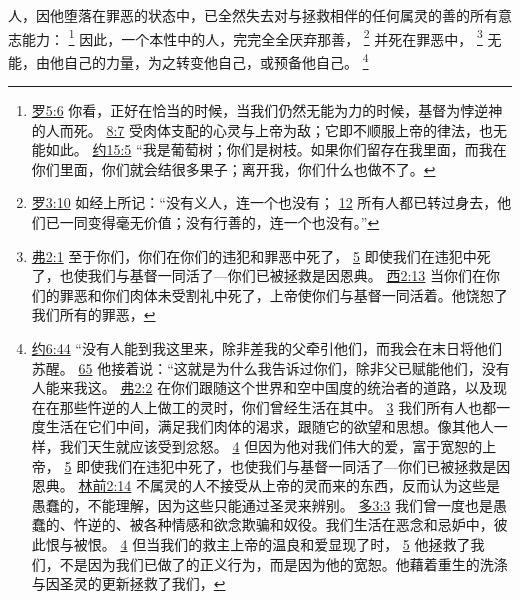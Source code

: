 \documentclass[12pt, a4paper, oneside]{ctexart}
\newcounter{parnum}[section]
\newcommand{\N}{%
   \noindent\refstepcounter{parnum}%
    \makebox[\parindent][l]{\textbf{\arabic{parnum}.}}}
\begin{document}
\N 人，因他堕落在罪恶的状态中，已全然失去对与拯救相伴的任何属灵的善的所有意志能力：
	\footnote {
		\href{https://biblehub.com/romans/5-6.htm}{罗5:6} 你看，正好在恰当的时候，当我们仍然无能为力的时候，基督为悖逆神的人而死。
		\href{https://biblehub.com/romans/8-7.htm}{8:7} 受肉体支配的心灵与上帝为敌；它即不顺服上帝的律法，也无能如此。
		\href{https://biblehub.com/john/15-5.htm}{约15:5} “我是葡萄树；你们是树枝。如果你们留存在我里面，而我在你们里面，你们就会结很多果子；离开我，你们什么也做不了。
	}
	因此，一个本性中的人，完完全全厌弃那善，
	\footnote {
		\href{https://biblehub.com/romans/3-10.htm}{罗3:10} 如经上所记：“没有义人，连一个也没有；
		\href{https://biblehub.com/romans/3-12.htm}{12} 所有人都已转过身去，他们已一同变得毫无价值；没有行善的，连一个也没有。”
	}
	并死在罪恶中，
	\footnote {
		\href{https://biblehub.com/ephesians/2-1.htm}{弗2:1} 至于你们，你们在你们的违犯和罪恶中死了， 
		\href{https://biblehub.com/ephesians/2-5.htm}{5} 即使我们在违犯中死了，也使我们与基督一同活了---你们已被拯救是因恩典。
		\href{https://biblehub.com/colossians/2-13.htm}{西2:13} 当你们在你们的罪恶和你们肉体未受割礼中死了，上帝使你们与基督一同活着。他饶恕了我们所有的罪恶，
	}
	无能，由他自己的力量，为之转变他自己，或预备他自己。
	\footnote {
		\href{https://biblehub.com/john/6-44.htm}{约6:44} “没有人能到我这里来，除非差我的父牵引他们，而我会在末日将他们苏醒。
		\href{https://biblehub.com/john/6-65.htm}{65} 他接着说：“这就是为什么我告诉过你们，除非父已赋能他们，没有人能来我这。
		\href{https://biblehub.com/ephesians/2-2.htm}{弗2:2} 在你们跟随这个世界和空中国度的统治者的道路，以及现在在那些忤逆的人上做工的灵时，你们曾经生活在其中。 
		\href{https://biblehub.com/ephesians/2-3.htm}{3} 我们所有人也都一度生活在它们中间，满足我们肉体的渴求，跟随它的欲望和思想。像其他人一样，我们天生就应该受到忿怒。
		\href{https://biblehub.com/ephesians/2-4.htm}{4} 但因为他对我们伟大的爱，富于宽恕的上帝，
		\href{https://biblehub.com/ephesians/2-5.htm}{5} 即使我们在违犯中死了，也使我们与基督一同活了---你们已被拯救是因恩典。
		\href{https://biblehub.com/1_corinthians/2-14.htm}{林前2:14} 不属灵的人不接受从上帝的灵而来的东西，反而认为这些是愚蠢的，不能理解，因为这些只能通过圣灵来辨别。 
		\href{https://biblehub.com/titus/3-3.htm}{多3:3} 我们曾一度也是愚蠢的、忤逆的、被各种情感和欲念欺骗和奴役。我们生活在恶念和忌妒中，彼此恨与被恨。
		\href{https://biblehub.com/titus/3-4.htm}{4} 但当我们的救主上帝的温良和爱显现了时，
		\href{https://biblehub.com/titus/3-5.htm}{5} 他拯救了我们，不是因为我们已做了的正义行为，而是因为他的宽恕。他藉着重生的洗涤与因圣灵的更新拯救了我们，
	}
\end{document}
